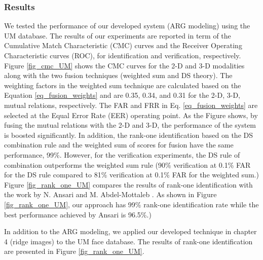 {\subsubsection{Results}
We tested the performance of our developed system (ARG modeling)
using the UM database. The results of our experiments are reported
in term of the Cumulative Match Characteristic (CMC) curves and the
Receiver Operating Characteristic curves (ROC), for identification
and verification, respectively. Figure \ref{fig_cmc_UM} shows the
CMC curves for the 2-D and 3-D modalities along with the two fusion
techniques (weighted sum and DS theory). The weighting factors in
the weighted sum technique are calculated based on the Equation
\ref{eq_fusion_weights} and are 0.35, 0.34, and 0.31 for the 2-D,
3-D, mutual relations, respectively. The FAR and FRR in Eq.
\ref{eq_fusion_weights} are selected at the Equal Error Rate (EER)
operating point. As the Figure shows, by fusing the mutual relations
with the 2-D and 3-D, the performance of the system is boosted
significantly. In addition, the rank-one identification based on the
DS combination rule and the weighted sum of scores for fusion have
the same performance, 99\%. However, for the verification
experiments, the DS rule of combination outperforms the weighted sum
rule (90\% verification at 0.1\% FAR for the DS rule compared to
81\% verification at 0.1\% FAR for the weighted sum.) Figure
\ref{fig_rank_one_UM} compares the results of rank-one
identification with the work by N. Ansari and M. Abdel-Mottaleb
\cite{Nasser07_thesis}. As shown in Figure \ref{fig_rank_one_UM},
our approach has 99\% rank-one identification rate while the best
performance achieved by Ansari is 96.5\%.)

In addition to the ARG modeling, we applied our developed technique
in chapter 4 (ridge images) to the UM face database. The results of
rank-one identification are presented in Figure
\ref{fig_rank_one_UM}.

}
